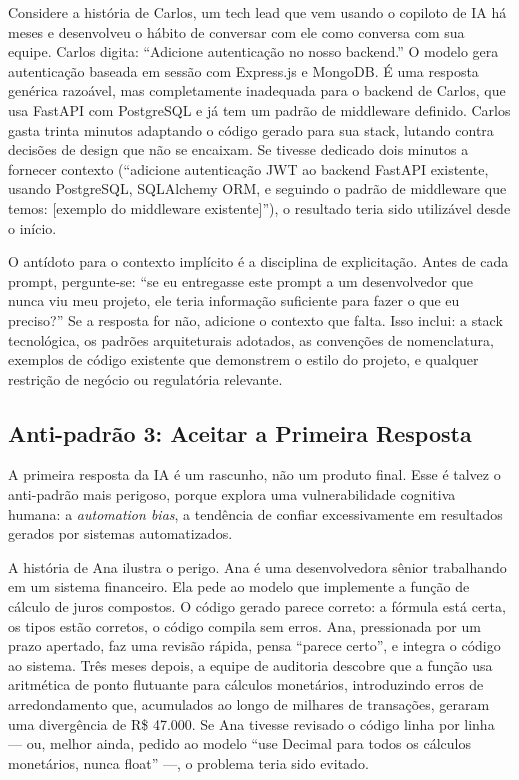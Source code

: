 Considere a história de Carlos, um tech lead que vem usando o copiloto de IA há
meses e desenvolveu o hábito de conversar com ele como conversa com sua equipe.
Carlos digita: ``Adicione autenticação no nosso backend.'' O modelo gera
autenticação baseada em sessão com Express.js e MongoDB. É uma
resposta genérica razoável, mas completamente inadequada para o backend de Carlos, que usa
FastAPI com PostgreSQL e já tem um padrão de middleware definido. Carlos gasta
trinta minutos adaptando o código gerado para sua stack, lutando contra decisões
de design que não se encaixam. Se tivesse dedicado dois minutos a fornecer
contexto (``adicione autenticação JWT ao backend FastAPI existente, usando
PostgreSQL, SQLAlchemy ORM, e seguindo o padrão de middleware que temos: [exemplo
do middleware existente]''), o resultado teria sido utilizável desde o início.

O antídoto para o contexto implícito é a disciplina de explicitação. Antes de
cada prompt, pergunte-se: ``se eu entregasse este prompt a um desenvolvedor que
nunca viu meu projeto, ele teria informação suficiente para fazer o que eu
preciso?'' Se a resposta for não, adicione o contexto que falta. Isso inclui:
a stack tecnológica, os padrões arquiteturais adotados, as convenções de
nomenclatura, exemplos de código existente que demonstrem o estilo do projeto, e
qualquer restrição de negócio ou regulatória relevante.

\subsection{Anti-padrão 3: Aceitar a Primeira Resposta}

A primeira resposta da IA é um rascunho, não um produto final. Esse é talvez o
anti-padrão mais perigoso, porque explora uma vulnerabilidade cognitiva humana: a
\textit{automation bias}, a tendência de confiar excessivamente em resultados
gerados por sistemas automatizados.

A história de Ana ilustra o perigo. Ana é uma desenvolvedora sênior trabalhando
em um sistema financeiro. Ela pede ao modelo que implemente a função de cálculo
de juros compostos. O código gerado parece correto: a fórmula está certa, os
tipos estão corretos, o código compila sem erros. Ana, pressionada por um prazo
apertado, faz uma revisão rápida, pensa ``parece certo'', e integra o código ao
sistema. Três meses depois, a equipe de auditoria descobre que a função usa
aritmética de ponto flutuante para cálculos monetários, introduzindo erros de
arredondamento que, acumulados ao longo de milhares de transações, geraram uma
divergência de R\$ 47.000. Se Ana tivesse revisado o código linha por linha ---
ou, melhor ainda, pedido ao modelo ``use Decimal para todos os cálculos
monetários, nunca float'' ---, o problema teria sido evitado.

